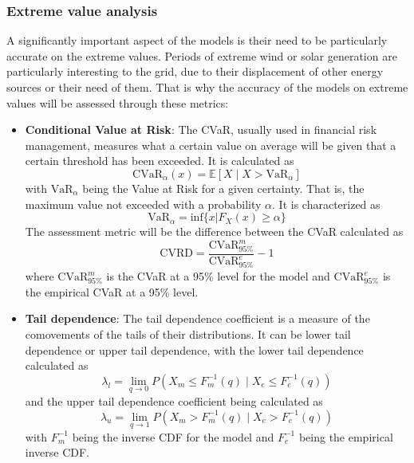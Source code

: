 \subsubsection{Extreme value analysis}
A significantly important aspect of the models is their need to be particularly accurate on the extreme values. Periods of extreme wind or solar generation are particularly interesting to the grid, due to their displacement of other energy sources or their need of them. That is why the accuracy of the models on extreme values will be assessed through these metrics:
\begin{itemize}
    \item \textbf{Conditional Value at Risk}: The CVaR, usually used in financial risk management, measures what a certain value on average will be given that a certain threshold has been exceeded. It is calculated as 
    \begin{equation}
        \text{CVaR}_{\alpha}(x) = \mathbb{E} \left[X\mid X>\text{VaR}_{\alpha}\right]
    \end{equation} 
    with $\text{VaR}_{\alpha}$ being the Value at Risk for a given certainty. That is, the maximum value not exceeded with a probability $\alpha$. It is characterized as 
    \begin{equation}
        \text{VaR}_{\alpha}=\text{inf}\{x|F_X(x)\geq\alpha\}
    \end{equation}
    The assessment metric will be the difference between the CVaR calculated as 
    \begin{equation}
        \text{CVRD}=\frac{\text{CVaR}^m_{95\%}}{\text{CVaR}^e_{95\%}}-1
    \end{equation}
    where $\text{CVaR}^m_{95\%}$ is the CVaR at a 95\% level for the model and $\text{CVaR}^e_{95\%}$ is the empirical CVaR at a 95\% level.
    \item \textbf{Tail dependence}: The tail dependence coefficient is a measure of the comovements of the tails of their distributions. It can be lower tail dependence or upper tail dependence, with the lower tail dependence calculated as 
    \begin{equation}
        \lambda_l=\lim_{q \to 0} P\left(X_m \leq F^{-1}_m(q) \mid X_e \leq F^{-1}_e(q)\right)  
    \end{equation}
    and the upper tail dependence coefficient being calculated as 
    \begin{equation}
        \lambda_u=\lim_{q \to 1} P\left(X_m > F^{-1}_m(q) \mid X_e > F^{-1}_e(q)\right)  
    \end{equation}
    with $F^{-1}_m$ being the inverse CDF for the model and $F^{-1}_e$ being the empirical inverse CDF.


\end{itemize}

